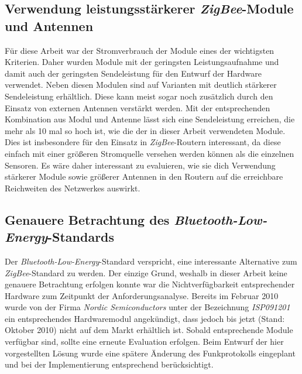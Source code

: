 \subsection{Verwendung leistungsstärkerer \emph{ZigBee}-Module und Antennen}
Für diese Arbeit war der Stromverbrauch der Module eines der wichtigsten Kriterien. Daher wurden Module mit der geringsten
Leistungsaufnahme und damit auch der geringsten Sendeleistung für den Entwurf der Hardware verwendet. Neben diesen
Modulen sind auf Varianten mit deutlich stärkerer Sendeleistung erhältlich. Diese kann meist sogar noch zusätzlich durch
den Einsatz von externen Antennen verstärkt werden. Mit der entsprechenden Kombination aus Modul und Antenne lässt sich eine
Sendeleistung erreichen, die mehr als 10 mal so hoch ist, wie die der in dieser Arbeit verwendeten Module. Dies ist 
insbesondere für den Einsatz in \emph{ZigBee}-Routern interessant, da diese einfach mit einer größeren Stromquelle versehen
werden können als die einzelnen Sensoren. Es wäre daher interessant zu evaluieren, wie sie dich Verwendung stärkerer Module
sowie größerer Antennen in den Routern auf die erreichbare Reichweiten des Netzwerkes auswirkt.

\subsection{Genauere Betrachtung des \emph{Bluetooth-Low-Energy}-Standards}
Der \emph{Bluetooth-Low-Energy}-Standard verspricht, eine interessante Alternative zum \emph{ZigBee}-Standard zu werden.
Der einzige Grund, weshalb in dieser Arbeit keine genauere Betrachtung erfolgen konnte war die Nichtverfügbarkeit
entsprechender Hardware zum Zeitpunkt der Anforderungsanalyse. Bereits im Februar 2010 wurde von der Firma 
\emph{Nordic Semiconductors} unter der Bezeichnung \emph{ISP091201} ein entsprechendes Hardwaremodul angekündigt,
dass jedoch bis jetzt (Stand: Oktober 2010) nicht auf dem Markt erhältlich ist. Sobald entsprechende Module verfügbar
sind, sollte eine erneute Evaluation erfolgen. Beim Entwurf der hier vorgestellten Lösung wurde eine spätere Änderung
des Funkprotokolls eingeplant und bei der Implementierung entsprechend berücksichtigt.
